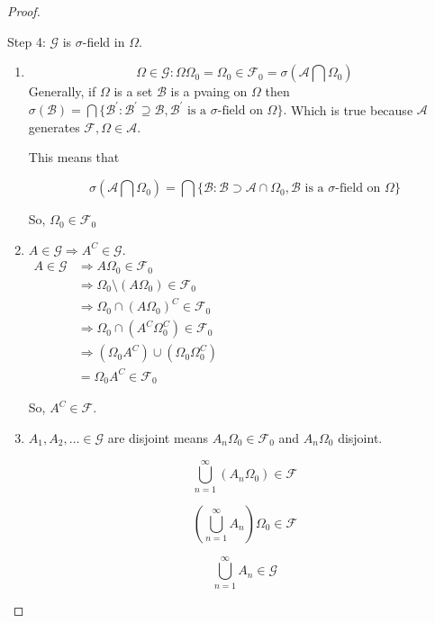\documentclass[11pt,fleqn]{book} %
\begin{document}
\begin{proof}
\begin{enumerate}[label = (\roman*)]
			Step 4: $\mathcal{G}$ is $\sigma$-field in $\Omega$.

				\begin{enumerate}
					\item $$\Omega \in \mathcal{G}: \Omega\Omega_0 = \Omega_0 \in \mathcal{F}_0 = \sigma(\mathcal{A} \bigcap \Omega_0)$$ 
					Generally, if $\Omega$ is a set $\mathcal{B}$ is a pvaing on $\Omega$ then $\sigma(\mathcal{B}) = \bigcap \{\mathcal{B}^\prime : \mathcal{B}^\prime \supseteq \mathcal{B}, \mathcal{B}^\prime \text{ is a }\sigma\text{-field on }\Omega \}.$ Which is true because $\mathcal{A}$ generates $\mathcal{F}, \Omega \in \mathcal{A}$.

					This means that 

							$$\sigma(\mathcal{A} \bigcap \Omega_0) = \bigcap \{\mathcal{B}: \mathcal{B} \supset \mathcal{A} \cap \Omega_0, \mathcal{B}  \text{ is a }\sigma\text{-field on }\Omega \} $$

					So, $\Omega_0 \in \mathcal{F}_0$
					\item $A \in \mathcal{G} \Rightarrow A^C \in \mathcal{G}$.\\

					$\begin{aligned}
						A \in \mathcal{G} &\Rightarrow A \Omega_0 \in \mathcal{F}_0\\
							&\Rightarrow \Omega_0 \setminus (A \Omega_0) \in \mathcal{F}_0\\
							&\Rightarrow \Omega_0 \cap (A \Omega_0)^C \in \mathcal{F}_0\\
							&\Rightarrow \Omega_0 \cap (A^C \Omega_0^C) \in \mathcal{F}_0\\
							&\Rightarrow (\Omega_0 A^C) \cup (\Omega_0 \Omega_0^C)\\
							&= \Omega_0 A^C \in \mathcal{F}_0
					\end{aligned}$

					So, $A^C \in \mathcal{F}$.

					\item $A_1,A_2, \dots \in \mathcal{G}$ are disjoint means $A_n\Omega_0 \in \mathcal{F}_0$ and $A_n\Omega_0$ disjoint.

						$$\bigcup^\infty_{n=1} (A_n \Omega_0) \in \mathcal{F} $$


						$$(\bigcup^\infty_{n=1} A_n) \Omega_0 \in \mathcal{F} $$

						$$\bigcup^\infty_{n=1} A_n \in \mathcal{G} $$


				\end{enumerate}
				


\end{enumerate}
\end{proof}
\end{document}
